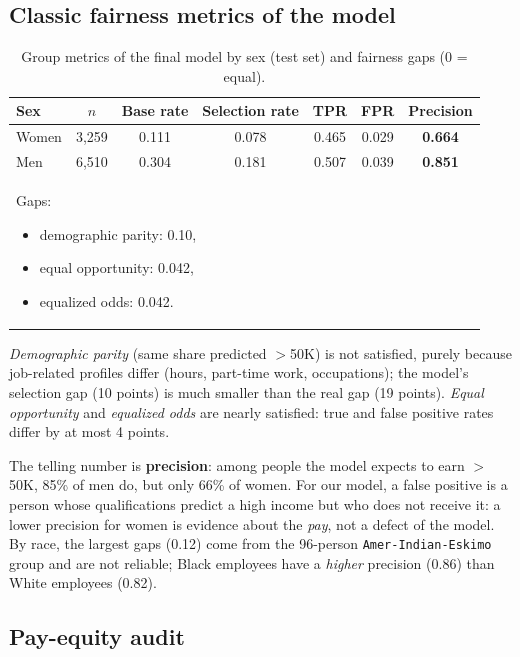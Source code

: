 \documentclass[11pt,a4paper]{article}
\begin{document}
\subsection{Classic fairness metrics of the model}

\begin{table}[H]
\centering\small
\caption{Group metrics of the final model by sex (test set) and fairness gaps (0 = equal).}
\label{tab:fairness}
\begin{tabular}{lcccccc}
\toprule
\rowcolor{headblue}
Sex & $n$ & Base rate & Selection rate & TPR & FPR & Precision \\
\midrule
Women & 3{,}259 & 0.111 & 0.078 & 0.465 & 0.029 & \textbf{0.664} \\
Men & 6{,}510 & 0.304 & 0.181 & 0.507 & 0.039 & \textbf{0.851} \\
\midrule
\multicolumn{7}{l}{\parbox{0.6\linewidth}{\vspace{2pt}Gaps:\begin{itemize}[leftmargin=1.5em,itemsep=0pt,topsep=0pt]\item demographic parity: 0.10,\item equal opportunity: 0.042,\item equalized odds: 0.042.\end{itemize}\vspace{2pt}}} \\
\bottomrule
\end{tabular}
\end{table}

\emph{Demographic parity} (same share predicted $>$50K) is not satisfied, purely because job-related profiles differ (hours, part-time work, occupations); the model's selection gap (10 points) is much smaller than the real gap (19 points). \emph{Equal opportunity} and \emph{equalized odds} are nearly satisfied: true and false positive rates differ by at most 4 points.

The telling number is \textbf{precision}: among people the model expects to earn $>$50K, 85\% of men do, but only 66\% of women. For our model, a false positive is a person whose qualifications predict a high income but who does not receive it: a lower precision for women is evidence about the \emph{pay}, not a defect of the model. By race, the largest gaps (0.12) come from the 96-person \texttt{Amer-Indian-Eskimo} group and are not reliable; Black employees have a \emph{higher} precision (0.86) than White employees (0.82).

\subsection{Pay-equity audit}
\end{document}
